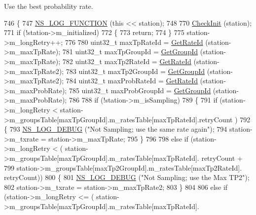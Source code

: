 Use the best probability rate. 
\begin{DoxyCode}
746 \{
747   \hyperlink{log-macros-disabled_8h_a90b90d5bad1f39cb1b64923ea94c0761}{NS\_LOG\_FUNCTION} (\textcolor{keyword}{this} << station);
748 
770   \hyperlink{classns3_1_1MinstrelHtWifiManager_a7f94804a34efa6121bdfd5d01ac34694}{CheckInit} (station);
771   \textcolor{keywordflow}{if} (!station->m\_initialized)
772     \{
773       \textcolor{keywordflow}{return};
774     \}
775   station->m\_longRetry++;
776 
780   uint32\_t maxTpRateId = \hyperlink{classns3_1_1MinstrelHtWifiManager_a6162341f1348bbe713d09642b09ac658}{GetRateId} (station->m\_maxTpRate);
781   uint32\_t maxTpGroupId = \hyperlink{classns3_1_1MinstrelHtWifiManager_a43157e6007b4b922043cb02a99ea6d1f}{GetGroupId} (station->m\_maxTpRate);
782   uint32\_t maxTp2RateId = \hyperlink{classns3_1_1MinstrelHtWifiManager_a6162341f1348bbe713d09642b09ac658}{GetRateId} (station->m\_maxTpRate2);
783   uint32\_t maxTp2GroupId = \hyperlink{classns3_1_1MinstrelHtWifiManager_a43157e6007b4b922043cb02a99ea6d1f}{GetGroupId} (station->m\_maxTpRate2);
784   uint32\_t maxProbRateId = \hyperlink{classns3_1_1MinstrelHtWifiManager_a6162341f1348bbe713d09642b09ac658}{GetRateId} (station->m\_maxProbRate);
785   uint32\_t maxProbGroupId = \hyperlink{classns3_1_1MinstrelHtWifiManager_a43157e6007b4b922043cb02a99ea6d1f}{GetGroupId} (station->m\_maxProbRate);
786 
788   \textcolor{keywordflow}{if} (!station->m\_isSampling)
789     \{
791       \textcolor{keywordflow}{if} (station->m\_longRetry <  station->m\_groupsTable[maxTpGroupId].m\_ratesTable[maxTpRateId].retryCount
      )
792         \{
793           \hyperlink{group__logging_ga413f1886406d49f59a6a0a89b77b4d0a}{NS\_LOG\_DEBUG} (\textcolor{stringliteral}{"Not Sampling; use the same rate again"});
794           station->m\_txrate = station->m\_maxTpRate;  
795         \}
796 
798       \textcolor{keywordflow}{else} \textcolor{keywordflow}{if} (station->m\_longRetry < ( station->m\_groupsTable[maxTpGroupId].m\_ratesTable[maxTpRateId].
      retryCount +
799                                         station->m\_groupsTable[maxTp2GroupId].m\_ratesTable[maxTp2RateId].
      retryCount))
800         \{
801           \hyperlink{group__logging_ga413f1886406d49f59a6a0a89b77b4d0a}{NS\_LOG\_DEBUG} (\textcolor{stringliteral}{"Not Sampling; use the Max TP2"});
802           station->m\_txrate = station->m\_maxTpRate2;
803         \}
804 
806       \textcolor{keywordflow}{else} \textcolor{keywordflow}{if} (station->m\_longRetry <= ( station->m\_groupsTable[maxTpGroupId].m\_ratesTable[maxTpRateId].

\end{DoxyCode}
